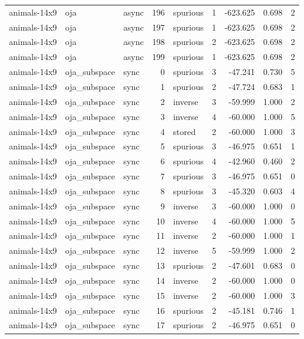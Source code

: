 \begin{tabular}{lllrlrrrr}
animals-14x9 & oja & async & 196 & spurious & 1 & -623.625 & 0.698 & 2 \\
animals-14x9 & oja & async & 197 & spurious & 1 & -623.625 & 0.698 & 2 \\
animals-14x9 & oja & async & 198 & spurious & 2 & -623.625 & 0.698 & 2 \\
animals-14x9 & oja & async & 199 & spurious & 1 & -623.625 & 0.698 & 2 \\
animals-14x9 & oja\_subspace & sync & 0 & spurious & 3 & -47.241 & 0.730 & 5 \\
animals-14x9 & oja\_subspace & sync & 1 & spurious & 2 & -47.724 & 0.683 & 1 \\
animals-14x9 & oja\_subspace & sync & 2 & inverse & 3 & -59.999 & 1.000 & 2 \\
animals-14x9 & oja\_subspace & sync & 3 & inverse & 4 & -60.000 & 1.000 & 5 \\
animals-14x9 & oja\_subspace & sync & 4 & stored & 2 & -60.000 & 1.000 & 3 \\
animals-14x9 & oja\_subspace & sync & 5 & spurious & 3 & -46.975 & 0.651 & 1 \\
animals-14x9 & oja\_subspace & sync & 6 & spurious & 4 & -42.960 & 0.460 & 2 \\
animals-14x9 & oja\_subspace & sync & 7 & spurious & 3 & -46.975 & 0.651 & 0 \\
animals-14x9 & oja\_subspace & sync & 8 & spurious & 3 & -45.320 & 0.603 & 4 \\
animals-14x9 & oja\_subspace & sync & 9 & inverse & 3 & -60.000 & 1.000 & 0 \\
animals-14x9 & oja\_subspace & sync & 10 & inverse & 4 & -60.000 & 1.000 & 5 \\
animals-14x9 & oja\_subspace & sync & 11 & inverse & 2 & -60.000 & 1.000 & 1 \\
animals-14x9 & oja\_subspace & sync & 12 & inverse & 5 & -59.999 & 1.000 & 2 \\
animals-14x9 & oja\_subspace & sync & 13 & spurious & 2 & -47.601 & 0.683 & 0 \\
animals-14x9 & oja\_subspace & sync & 14 & inverse & 2 & -60.000 & 1.000 & 0 \\
animals-14x9 & oja\_subspace & sync & 15 & inverse & 2 & -60.000 & 1.000 & 3 \\
animals-14x9 & oja\_subspace & sync & 16 & spurious & 2 & -45.181 & 0.746 & 1 \\
animals-14x9 & oja\_subspace & sync & 17 & spurious & 2 & -46.975 & 0.651 & 0 \\

\end{tabular}
